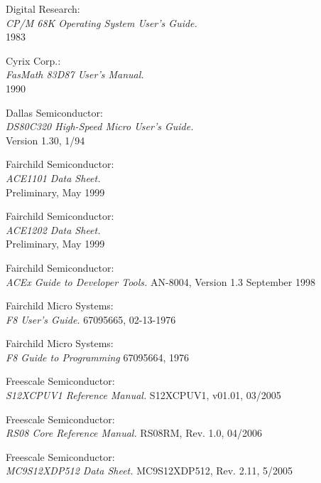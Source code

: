  Digital Research: \\
                 {\em CP/M 68K Operating System User's Guide.\/} \\
        	 1983

 Cyrix Corp.: \\
                {\em FasMath 83D87 User's Manual.\/} \\
		1990

 Dallas Semiconductor: \\
		    {\em DS80C320 High-Speed Micro User's Guide.\/} \\
                    Version 1.30, 1/94

 Fairchild Semiconductor: \\
                   {\em ACE1101 Data Sheet.\/} \\
                   Preliminary, May 1999

 Fairchild Semiconductor: \\
                   {\em ACE1202 Data Sheet.\/} \\
                   Preliminary, May 1999

 Fairchild Semiconductor: \\
                   {\em ACEx Guide to Developer Tools.\/}
                   AN-8004, Version 1.3 September 1998

 Fairchild Micro Systems: \\
                   {\em F8 User's Guide.\/}
                   67095665, 02-13-1976                   

 Fairchild Micro Systems: \\
                   {\em F8 Guide to Programming\/}
                   67095664, 1976

 Freescale Semiconductor: \\
                  {\em S12XCPUV1 Reference Manual.\/}
                  S12XCPUV1, v01.01, 03/2005

 Freescale Semiconductor: \\
                  {\em RS08 Core Reference Manual.\/}
                  RS08RM, Rev. 1.0, 04/2006     

 Freescale Semiconductor: \\
                    {\em MC9S12XDP512 Data Sheet.\/}
                    MC9S12XDP512, Rev. 2.11, 5/2005

